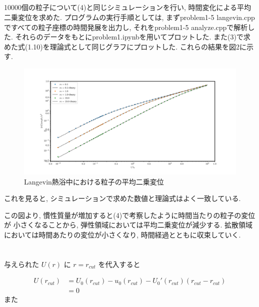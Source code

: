 \documentclass[a4paper,dvipdfmx]{jarticle}
\begin{document}
\subsection{}
\noindent
10000個の粒子について(4)と同じシミュレーションを行い, 時間変化による平均二乗変位を求めた.
プログラムの実行手順としては, まずproblem1-5 langevin.cppですべての粒子座標の時間発展を出力し, 
それをproblem1-5 analyze.cppで解析した.
それらのデータをもとにproblem1.ipynbを用いてプロットした.
また(3)で求めた式(1.10)を理論式として同じグラフにプロットした.
これらの結果を図2に示す.

\begin{figure}[H]
    \centering
    \includegraphics[scale=0.4]{problem_1/1-5/problem1-5.pdf}
    \caption{Langevin熱浴中における粒子の平均二乗変位}
\end{figure}
これを見ると, シミュレーションで求めた数値と理論式はよく一致している.

\noindent
この図より, 慣性質量が増加すると(4)で考察したように時間当たりの粒子の変位が
小さくなることから, 弾性領域においては平均二乗変位が減少する. 
拡散領域においては時間あたりの変位が小さくなり, 時間経過とともに収束していく.


\newpage

\section{}
\subsection{}
\noindent
与えられた $U(r)$ に $r=r_{cut}$ を代入すると

\begin{align*}
    U(r_{cut}) &= U_0(r_{cut}) - u_0(r_{cut}) - U_0'(r_{cut}) (r_{cut} - r_{cut}) \\
    &= 0 \tag{2.1}
\end{align*}
また
\end{document}
